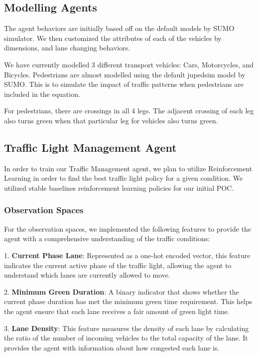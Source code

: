 \subsection{Modelling Agents}
The agent behaviors are initially based off on the default models by SUMO simulator. We then customized the attributes of each of the vehicles by dimensions, and lane changing behaviors. 

We have currently modelled 3 different transport vehicles: Cars, Motorcycles, and Bicycles. Pedestrians are almost modelled using the default jupedsim model by SUMO. This is to simulate the impact of traffic patterns when pedestrians are included in the equation. 

For pedestrians, there are crossings in all 4 legs. The adjacent crossing of each leg also turns green when that particular leg for vehicles also turns green.

\subsection{Traffic Light Management Agent}
In order to train our Traffic Management agent, we plan to utilize Reinforcement Learning in order to find the best traffic light policy for a given condition. We utilized stable baselines reinforcement learning policies for our initial POC.

\subsubsection{Observation Spaces}

For the observation spaces, we implemented the following features to provide the agent with a comprehensive understanding of the traffic conditions:

1. \textbf{Current Phase Lane}: Represented as a one-hot encoded vector, this feature indicates the current active phase of the traffic light, allowing the agent to understand which lanes are currently allowed to move.

2. \textbf{Minimum Green Duration}: A binary indicator that shows whether the current phase duration has met the minimum green time requirement. This helps the agent ensure that each lane receives a fair amount of green light time.

3. \textbf{Lane Density}: This feature measures the density of each lane by calculating the ratio of the number of incoming vehicles to the total capacity of the lane. It provides the agent with information about how congested each lane is.

